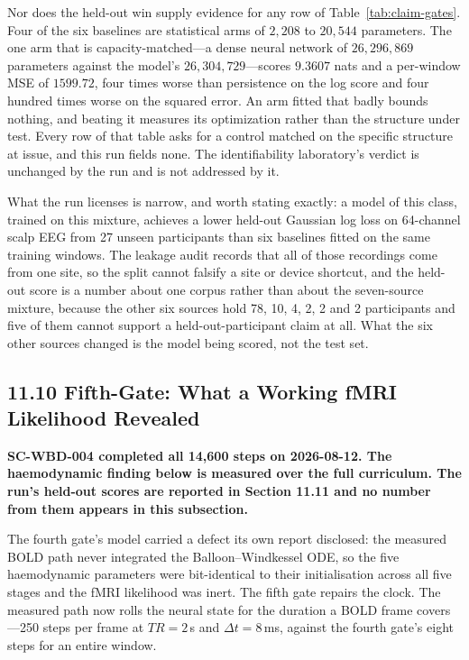 Nor does the held-out win supply evidence for any row of
Table~\ref{tab:claim-gates}. Four of the six baselines are statistical arms of
\(2{,}208\) to \(20{,}544\) parameters. The one arm that is capacity-matched---a
dense neural network of \(26{,}296{,}869\) parameters against the model's
\(26{,}304{,}729\)---scores \(9.3607\) nats and a per-window MSE of \(1599.72\),
four times worse than persistence on the log score and four hundred times worse
on the squared error. An arm fitted that badly bounds nothing, and beating it
measures its optimization rather than the structure under test. Every row of
that table asks for a control matched on the specific structure at issue, and
this run fields none. The identifiability laboratory's verdict is unchanged by
the run and is not addressed by it.

What the run licenses is narrow, and worth stating exactly: a model of this class,
trained on this mixture, achieves a lower held-out Gaussian log loss on
64-channel scalp EEG from 27 unseen participants than six baselines fitted on the
same training windows. The leakage audit records that all of those recordings
come from one site, so the split cannot falsify a site or device shortcut, and
the held-out score is a number about one corpus rather than about the
seven-source mixture, because the other six sources hold 78, 10, 4, 2, 2 and 2
participants and five of them cannot support a held-out-participant claim at all.
What the six other sources changed is the model being scored, not the test set.

\subsection{11.10 Fifth-Gate: What a Working fMRI Likelihood Revealed}

\textbf{SC-WBD-004 completed all 14{,}600 steps on 2026-08-12. The haemodynamic
finding below is measured over the full curriculum. The run's held-out scores are
reported in Section 11.11 and no number from them appears in this subsection.}

The fourth gate's model carried a defect its own report disclosed: the measured
BOLD path never integrated the Balloon--Windkessel ODE, so the five haemodynamic
parameters were bit-identical to their initialisation across all five stages and
the fMRI likelihood was inert. The fifth gate repairs the clock. The measured
path now rolls the neural state for the duration a BOLD frame covers---250 steps
per frame at \(TR = 2\)\,s and \(\Delta t = 8\)\,ms, against the fourth gate's
eight steps for an entire window.

